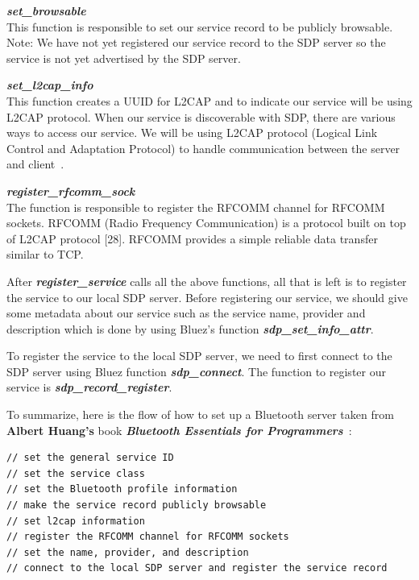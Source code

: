 \documentclass[letterpaper,twocolumn,10pt]{article}
\begin{document}
{\hrulefill

\textbf{\emph{set\_browsable}}\\
This function is responsible to set our service record to be publicly browsable. Note: We have not yet registered our service record to the SDP server so the service is not yet advertised by the SDP server.

\hrulefill

\textbf{\emph{set\_l2cap\_info}}\\
This function creates a UUID for L2CAP and to indicate our service will be using L2CAP protocol. When our service is discoverable with SDP, there are various ways to access our service. We will be using L2CAP protocol (Logical Link Control and Adaptation Protocol) to handle communication between the server and client~\cite{bluetooth_sdp_development}.

\hrulefill

\textbf{\emph{register\_rfcomm\_sock}}\\
The function is responsible to register the RFCOMM channel for RFCOMM sockets. RFCOMM (Radio Frequency Communication) is a protocol built on top of L2CAP protocol [28]. RFCOMM provides a simple reliable data transfer similar to TCP.

\hrulefill

After \textbf{\emph{register\_service}} calls all the above functions, all that is left is to register the service to our local SDP server. Before registering our service, we should give some metadata about our service such as the service name, provider and description which is done by using Bluez's function \textbf{\emph{sdp\_set\_info\_attr}}.

To register the service to the local SDP server, we need to first connect to the SDP server using Bluez function \textbf{\emph{sdp\_connect}}. The function to register our service is \textbf{\emph{sdp\_record\_register}}.

To summarize, here is the flow of how to set up a Bluetooth server taken from \textbf{Albert Huang's} book \textbf{\emph{Bluetooth Essentials for Programmers}}~\cite{bluetooth_essentials_book}:
{\small
\begin{lstlisting}// set the general service ID
// set the service class
// set the Bluetooth profile information
// make the service record publicly browsable
// set l2cap information
// register the RFCOMM channel for RFCOMM sockets
// set the name, provider, and description
// connect to the local SDP server and register the service record
\end{lstlisting}

}}
\end{document}
